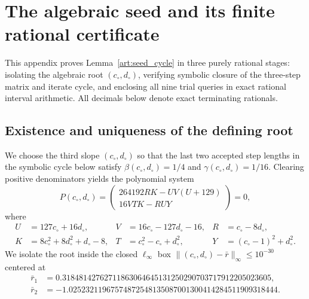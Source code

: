 \section{The algebraic seed and its finite rational certificate}
\label{art:seed_certificate}

This appendix proves Lemma~\ref{art:seed_cycle} in three purely rational stages:
isolating the algebraic root $(c_\circ,d_\circ)$, verifying symbolic closure of
the three-step matrix and iterate cycle, and enclosing all nine trial queries in
exact rational interval arithmetic. All decimals below denote exact terminating
rationals.

\subsection{Existence and uniqueness of the defining root}
We choose the third slope $(c_\circ,d_\circ)$ so that the last two accepted step
lengths in the symbolic cycle below satisfy $\beta(c_\circ,d_\circ)=1/4$ and
$\gamma(c_\circ,d_\circ)=1/16$. Clearing positive denominators yields the polynomial system
\begin{equation}\label{art:seed_polynomials}
 P(c_\circ,d_\circ)=
 \begin{pmatrix}264192RK-UV(U+129)\\16VTK-RUY\end{pmatrix}=0,
\end{equation}
where
\begin{align*}
 U&=127c_\circ+16d_\circ,&V&=16c_\circ-127d_\circ-16,&R&=c_\circ-8d_\circ,\\
 K&=8c_\circ^2+8d_\circ^2+d_\circ-8,&T&=c_\circ^2-c_\circ+d_\circ^2,&Y&=(c_\circ-1)^2+d_\circ^2.
\end{align*}
We isolate the root inside the closed $\ell_\infty$ box
$\|(c_\circ,d_\circ)-\bar r\|_\infty\le10^{-30}$ centered at
\begin{align*}
 \bar r_1&=0.31848142762711863064645131250290703717912205023605,\\
 \bar r_2&=-1.02523211967574872548135087001300414284511909318444.
\end{align*}


